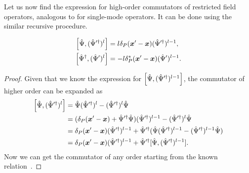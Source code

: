 Let us now find the expression for high-order commutators of restricted field operators, analogous to  for single-mode operators.
It can be done using the similar recursive procedure.

\begin{lemma}
\begin{equation*}
\begin{split}
	\left[ \hat{\Psi}, ( \hat{\Psi}^{\prime\dagger} )^l \right]
	& = l \delta_P (\boldsymbol{x}^\prime - \boldsymbol{x}) ( \hat{\Psi}^{\prime\dagger} )^{l-1}, \\
	\left[ \hat{\Psi}^\dagger, ( \hat{\Psi}^\prime )^l \right]
	& = - l \delta_P^* (\boldsymbol{x}^\prime - \boldsymbol{x}) ( \hat{\Psi}^\prime )^{l-1}.
\end{split}
\end{equation*}
\end{lemma}
\begin{proof}
Given that we know the expression for $\left[ \hat{\Psi}, ( \hat{\Psi}^{\prime\dagger} )^{l-1} \right]$,
the commutator of higher order can be expanded as
\begin{equation*}
\begin{split}
	\left[ \hat{\Psi}, ( \hat{\Psi}^{\prime\dagger} )^l \right]
	& = \hat{\Psi} ( \hat{\Psi}^{\prime\dagger} )^l - ( \hat{\Psi}^{\prime\dagger} )^l \hat{\Psi} \\
	& = (
		\delta_P (\boldsymbol{x}^\prime - \boldsymbol{x}) + \hat{\Psi}^{\prime\dagger} \hat{\Psi}
	) ( \hat{\Psi}^{\prime\dagger} )^{l-1}
	- ( \hat{\Psi}^{\prime\dagger} )^l \hat{\Psi} \\
	& = \delta_P (\boldsymbol{x}^\prime - \boldsymbol{x}) ( \hat{\Psi}^{\prime\dagger} )^{l-1}
	+ \hat{\Psi}^{\prime\dagger} (
		\hat{\Psi} ( \hat{\Psi}^{\prime\dagger} )^{l-1}
		- ( \hat{\Psi}^{\prime\dagger} )^{l-1} \hat{\Psi}
	) \\
	& = \delta_P (\boldsymbol{x}^\prime - \boldsymbol{x}) ( \hat{\Psi}^{\prime\dagger} )^{l-1}
	+ \hat{\Psi}^{\prime\dagger} [
		\hat{\Psi}, ( \hat{\Psi}^{\prime\dagger} )^{l-1}
	].
\end{split}
\end{equation*}
Now we can get the commutator of any order starting from the known relation~.
\end{proof}

